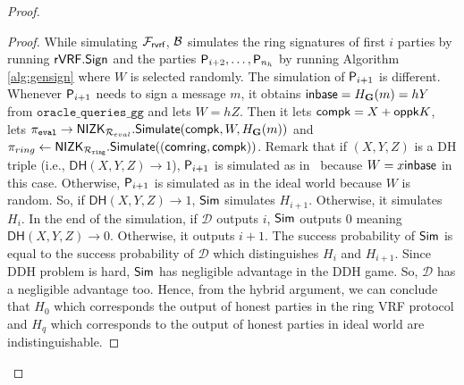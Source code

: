 \begin{proof}
\begin{proof}
%				
%				
		
			
			While simulating $ \mathcal{F}_{\textsf{rvrf}} $, $\mathcal{B} $ simulates the ring signatures of first $ i $ parties by running $ {\mathsf{rVRF}}.{\mathsf{Sign}} $ and the parties $ \mathsf{P}_{i+2}, \ldots, \mathsf{P}_{n_h} $ by running Algorithm \ref{alg:gensign} where $ W $ is selected randomly. The simulation of $ \mathsf{P}_{i + 1} $ is different.  Whenever $ \mathsf{P}_{i+1} $ needs to sign a message $ m$, it obtains $ {\mathsf{inbase}} = H_{\mathbf{G}}(m) = hY $ from $ \mathtt{oracle\_queries\_gg} $ and lets $ W = hZ $. Then it lets $ \mathsf{compk} = X + \mathsf{oppk}K $, lets  $ \pi_{\mathtt{eval}} \rightarrow {\ensuremath{\mathsf{NIZK}}}_{\mathcal{R}_{eval}}.{\mathsf{Simulate}}(\mathsf{compk},W,H_{\mathbf{G}}(m)) $ and  $ \pi_{ring} \leftarrow {\ensuremath{\mathsf{NIZK}}}_{\mathcal{R}_{\mathtt{ring}}}.{\mathsf{Simulate}}((\mathsf{comring}, \mathsf{compk})) $.  Remark that if $ (X,Y,Z)$ is a DH triple (i.e., $  \mathsf{DH}(X,Y,Z) \rightarrow 1 $), $ \mathsf{P}_{i+1} $ is simulated as in \name \ because $ W = x{\mathsf{inbase}}$ in this case. Otherwise, $ \mathsf{P}_{i+1} $ is simulated as in the ideal world because $ W $ is random. So, if $  \mathsf{DH}(X,Y,Z)  \rightarrow 1$, $\mathsf{Sim} $ simulates $ H_{i+1} $. Otherwise, it simulates $ H_{i} $. In the end of the simulation, if $ \mathcal{D} $ outputs $ i $, $\mathsf{Sim} $ outputs $ 0 $ meaning $  \mathsf{DH}(X,Y,Z) \rightarrow 0$. Otherwise, it outputs $ i + 1 $. The success probability of $\mathsf{Sim} $ is equal to the success probability of $\mathcal{D} $ which distinguishes $ H_i $ and $ H_{i +1} $. Since DDH problem is hard, $\mathsf{Sim} $ has negligible advantage in the DDH game. So, $ \mathcal{D} $ has a negligible advantage too. Hence, from the hybrid argument, we can conclude that $ H_0    $ which corresponds the output of honest parties in  the ring VRF protocol and $ H_q  $ which corresponds to  the output of honest parties in ideal world are indistinguishable.
			

\end{proof}
\end{proof}
